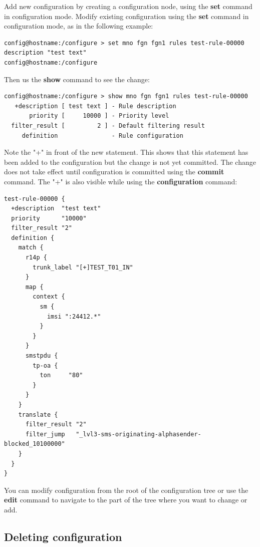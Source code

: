 \documentclass[a4paper,latin]{paper}
\begin{document}
Add new configuration by creating a configuration node, using the \textbf{set} command in
configuration mode. Modify existing configuration using the \textbf{set} command in configuration
mode, as in the following example:
\begin{lstlisting}[style=BashInputStyle]
config@hostname:/configure > set mno fgn fgn1 rules test-rule-00000 description "test text"
config@hostname:/configure 
\end{lstlisting}
Then us the \textbf{show} command to see the change:
\begin{lstlisting}[style=BashInputStyle]
config@hostname:/configure > show mno fgn fgn1 rules test-rule-00000
   +description [ test text ] - Rule description
       priority [     10000 ] - Priority level  
  filter_result [         2 ] - Default filtering result
     definition               - Rule configuration
\end{lstlisting}
Note the "+" in front of the new statement. This shows that this statement has been added
to the configuration but the change is not yet committed. The change does not take effect
until configuration is committed using the \textbf{commit} command.\newline\newline
The "+" is also visible while using the \textbf{configuration} command:
\begin{lstlisting}[style=BashInputStyle]
test-rule-00000 {
  +description  "test text"
  priority      "10000"
  filter_result "2"
  definition {
    match {
      r14p {
        trunk_label "[+]TEST_T01_IN"
      }
      map {
        context {
          sm {
            imsi ":24412.*"
          }
        }
      }
      smstpdu {
        tp-oa {
          ton     "80"
        }
      }
    }
    translate {
      filter_result "2"
      filter_jump   "_lvl3-sms-originating-alphasender-blocked_10100000"
    }
  }
} 
\end{lstlisting}
You can modify configuration from the root of the configuration tree or use the \textbf{edit}
command to navigate to the part of the tree where you want to change or add.

\subsection{Deleting configuration}
\end{document}
